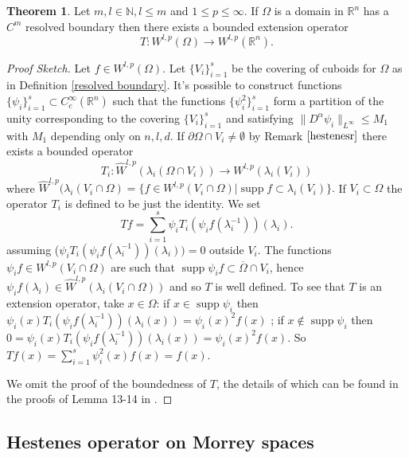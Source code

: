 \documentclass[12pt]{article}
\theoremstyle{definition}
\newtheorem{theorem}{Theorem}
\DeclareMathOperator\supp{supp}
\begin{document}
\begin{theorem}\label{teorh}
Let $m,l \in \mathbb{N}, l\le m$ and $1\le p\le\infty$. If $\Omega$ is a domain in $\mathbb{R}^n$ has a $C^m$ resolved boundary then there exists a bounded extension operator
\[ T: W^{l,p}(\Omega) \rightarrow W^{l,p}(\mathbb{R}^n).\]
\end{theorem}
\begin{proof}[Proof Sketch]
Let $f \in W^{l,p}(\Omega)$. Let $\{V_i\}_{i=1}^s$ be the covering of cuboids for $\Omega$ as in Definition \ref{resolved boundary}. It's possible to construct functions $\{ \psi_i \}_{i=1}^s \subset C^\infty_c(\mathbb{R}^n)$ such that the functions $\{ \psi^2_i \}_{i=1}^s$ form a partition of the unity corresponding to the covering $\{V_i\}_{i=1}^s$ and satisfying $\|D^\alpha \psi_i \|_{L^\infty}\le M_1$ with $M_1$ depending only on $n,l,d$.  If $\partial \Omega \cap V_i \neq \emptyset$ by Remark $\ref{hestenesr}$ there exists a bounded operator
\[ T_i : \widehat W^{l,p}(\lambda_i(\Omega \cap V_i))\rightarrow W^{l,p}(\lambda_i(V_i))\]
where $\widehat W^{l,p}(\lambda_i(V_i\cap \Omega)=\{f \in W^{l,p}(V_i\cap \Omega) | \supp f \subset \lambda_i(V_i)  \}.$ If $V_i \subset \Omega$ the operator $T_i$ is defined to be just the identity. We set
\[ Tf = \sum_{i=1}^s \psi_iT_i(\psi_if(\lambda_i^{-1}))(\lambda_i).\]
assuming ($\psi_iT_i(\psi_if(\lambda_i^{-1}))(\lambda_i))=0$ outside $V_i$. The functions $\psi_if \in W^{l,p}(V_i\cap \Omega)$ are such that $\supp \psi_if \subset \overline \Omega \cap V_i$, hence $\psi_i f(\lambda_i) \in \widehat W^{l,p}(\lambda_i(V_i\cap \Omega))$ and so $T$ is well defined. To see that $T$ is an extension operator, take $x \in \Omega$: if $x \in \supp \psi_i$ then $\psi_i(x)T_i(\psi_if(\lambda_i^{-1}))(\lambda_i(x))=\psi_i(x)^2 f(x)$ ; if $x \notin \supp \psi_i$ then $0=\psi_i(x)T_i(\psi_if(\lambda_i^{-1}))(\lambda_i(x))=\psi_i(x)^2 f(x)$. So $Tf(x)=\sum\limits_{i=1}^s \psi_i^2(x) f(x)=f(x)$. 

We omit the proof of the boundedness of $T$, the details of which can be found in the proofs of Lemma 13-14 in \cite{burenkov}.
\end{proof}

\subsection{Hestenes operator on Morrey spaces}
\end{document}
